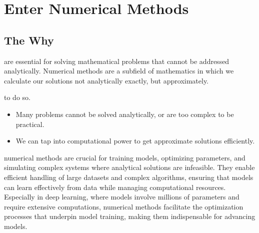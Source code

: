 \chapter{Enter Numerical Methods}



\section{The Why}  
 \cite{arensmathematik} \cite{dahmennumerik} \cite{deisenrothmathematics} \cite{deuflhardnumerische} are essential for solving mathematical problems that cannot be addressed analytically. 
Numerical methods are a subfield of mathematics in which we calculate our solutions not analytically exactly, but approximately.



 to do so.
\begin{itemize}
    \item Many problems cannot be solved analytically, or are too complex to be practical.
    \item We can tap into computational power to get approximate solutions efficiently.
\end{itemize} 





 numerical methods are crucial for training models, optimizing parameters, 
and simulating complex systems where analytical solutions are infeasible. 
They enable efficient handling of large datasets and complex algorithms, ensuring that models can learn effectively 
from data while managing computational resources. Especially in deep learning, where models involve millions of parameters and require extensive computations,
numerical methods facilitate the optimization processes that underpin model training, making them indispensable for advancing models.

